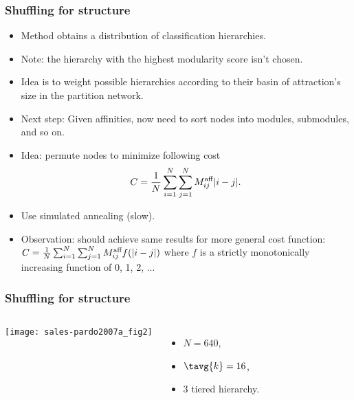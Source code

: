 \begin{frame}
  \frametitle{Shuffling for structure}

  \begin{itemize}
  \item<1-> 
    Method obtains a distribution of classification hierarchies.
  \item<2->
    Note: the hierarchy with the highest modularity score
    isn't chosen.
  \item<3->
    Idea is to weight possible hierarchies according
    to their basin of attraction's size in the partition network.
  \item<4->
    \alert{Next step:} Given affinities, now need to
    sort nodes into modules, submodules, and so on.
  \item<5->
    \alert{Idea:} permute nodes to minimize
    following cost
    $$
    C = \frac{1}{N} 
    \sum_{i=1}^{N}
    \sum_{j=1}^{N}
    M_{ij}^{\textnormal{aff}} | i - j|.
    $$
  \item<6->
    Use simulated annealing (slow).
  \item<7->
    \alert{Observation:} should achieve same results
    for more general cost function:
    $
    C = \frac{1}{N} 
    \sum_{i=1}^{N}
    \sum_{j=1}^{N}
    M_{ij}^{\textnormal{aff}} f(|i - j|)
    $
    where $f$ is a strictly monotonically increasing
    function of 0, 1, 2, ...
  \end{itemize}

\end{frame}

\begin{frame}
  \frametitle{Shuffling for structure}

  \begin{columns}
    \texttt{[image: sales-pardo2007a\_fig2]}
    \begin{itemize}
    \item 
      $N=640$,
    \item 
      $\tavg{k}=16$, 
    \item 
      3 tiered hierarchy.
    \end{itemize}
  \end{columns}

\end{frame}

